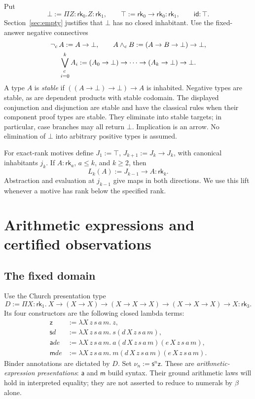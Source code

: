 \documentclass[11pt,a4paper]{article}
\newcommand{\rk}[1]{\mathsf{rk}_{#1}}
\newcommand{\zz}{\mathsf z}
\newcommand{\ssu}{\mathsf s}
\newcommand{\addD}{\mathsf a}
\newcommand{\mm}{\mathsf m}
\newcommand{\num}[1]{\nu_{#1}}
\newcommand{\nc}{\mathop{\neg}\nolimits_c}
\newcommand{\ac}{\mathbin{\wedge_c}}
\newcommand{\Orc}{\mathop{\bigvee_{\!c}}\displaylimits}
\theoremstyle{remark}\newtheorem*{remark}{Remark}
\begin{document}
Put
\[
 \bot:=\Pi Z:\rk0.Z:\rk1,\qquad
 \top:=\rk0\to\rk0:\rk1,\qquad \mathsf{id}:\top.
\]
Section~\ref{sec:empty} justifies that $\bot$ has no closed inhabitant.
Use the fixed-answer negative connectives
\begin{gather*}
 \nc A:=A\to\bot,\qquad
 A\ac B:=(A\to B\to\bot)\to\bot,\\
 \Orc_{i=0}^k A_i:=(A_0\to\bot)\to\cdots\to(A_k\to\bot)\to\bot.
\end{gather*}
A type $A$ is \emph{stable} if $((A\to\bot)\to\bot)\to A$ is inhabited.
Negative types are stable, as are dependent products with stable codomain.
The displayed conjunction and disjunction are stable and have the classical
rules when their component proof types are stable. They eliminate into
stable targets; in particular, case branches may all return $\bot$.
Implication is an arrow. No elimination of $\bot$ into arbitrary positive
types is assumed.

For exact-rank motives define $J_1:=\top$, $J_{k+1}:=J_k\to J_k$, with
canonical inhabitants $j_k$. If $A:\rk a$, $a\leq k$, and $k\geq2$, then
\[
 L_k(A):=J_{k-1}\to A:\rk k.
\]
Abstraction and evaluation at $j_{k-1}$ give maps in both directions.
We use this lift whenever a motive has rank below the specified rank.

\section{Arithmetic expressions and certified observations}
\subsection*{The fixed domain}
Use the Church presentation type
\[
 D:=\Pi X:\rk1.\ X\to(X\to X)\to(X\to X\to X)
                         \to(X\to X\to X)\to X:\rk3.
\]
Its four constructors are the following closed lambda terms:
\begin{align*}
 \zz&:=\lambda X\,z\,s\,a\,m.\ z,\\
 \ssu d&:=\lambda X\,z\,s\,a\,m.\ s(d\,X\,z\,s\,a\,m),\\
 \addD d e&:=\lambda X\,z\,s\,a\,m.\ a(d\,X\,z\,s\,a\,m)(e\,X\,z\,s\,a\,m),\\
 \mm d e&:=\lambda X\,z\,s\,a\,m.\ m(d\,X\,z\,s\,a\,m)(e\,X\,z\,s\,a\,m).
\end{align*}
Binder annotations are dictated by $D$. Set $\num n:=\ssu^n\zz$.
These are \emph{arithmetic-expression presentations}: $\addD$ and $\mm$ build
syntax. Their ground arithmetic laws will hold in interpreted equality;
they are not asserted to reduce to numerals by $\beta$ alone.
\end{document}

